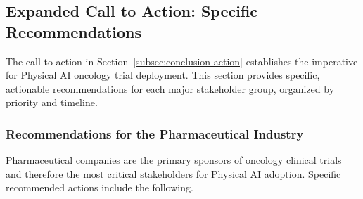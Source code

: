 \subsection{Expanded Call to Action: Specific Recommendations}
\label{subsec:conclusion-expanded-action}

The call to action in Section~\ref{subsec:conclusion-action} establishes the
imperative for Physical AI oncology trial deployment. This section provides
specific, actionable recommendations for each major stakeholder group,
organized by priority and timeline.

\subsubsection{Recommendations for the Pharmaceutical Industry}

Pharmaceutical companies are the primary sponsors of oncology clinical trials
and therefore the most critical stakeholders for Physical AI adoption.
Specific recommended actions include the following.

